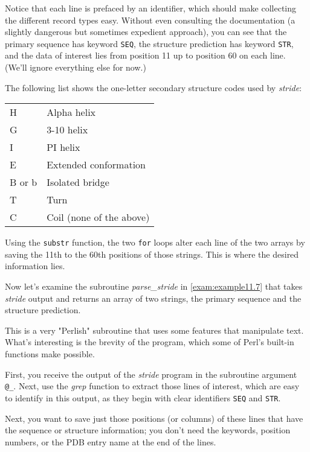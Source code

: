 Notice that each line is prefaced by an identifier, which should make collecting the different record types easy. Without even consulting the documentation (a slightly dangerous but sometimes expedient approach), you can see that the primary sequence has keyword \verb|SEQ|, the structure prediction has keyword \verb|STR|, and the data of interest lies from position 11 up to position 60 on each line. (We'll ignore everything else for now.)

The following list shows the one-letter secondary structure codes used by \textit{stride}: 

\begin{table}[!htbp]
  \begin{center}
  \begin{tabu} to 0.5\linewidth {X[1,l]X[2,l]}
  \toprule
  H & Alpha helix\\
  G & 3-10 helix\\
  I & PI helix\\
  E & Extended conformation\\
  B or b& Isolated bridge\\
  T & Turn\\
  C & Coil (none of the above)\\
  \bottomrule
  \end{tabu}
  \end{center}
\end{table}

Using the \verb|substr| function, the two \verb|for| loops alter each line of the two arrays by saving the 11th to the 60th positions of those strings. This is where the desired information lies.

Now let's examine the subroutine \textit{parse\_stride} in \autoref{exam:example11.7} that takes \textit{stride} output and returns an array of two strings, the primary sequence and the structure prediction.

This is a very "Perlish" subroutine that uses some features that manipulate text. What's interesting is the brevity of the program, which some of Perl's built-in functions make possible.

First, you receive the output of the \textit{stride} program in the subroutine argument \verb|@_|. Next, use the \textit{grep} function to extract those lines of interest, which are easy to identify in this output, as they begin with clear identifiers \verb|SEQ| and \verb|STR|.  

Next, you want to save just those positions (or columns) of these lines that have the sequence or structure information; you don't need the keywords, position numbers, or the PDB entry name at the end of the lines.

